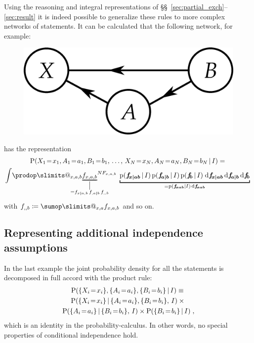 \documentclass[\ifafour a4paper,12pt,\else a5paper,10pt,\fi%
onecolumn,oneside,article,%
british%
]{memoir}
\makeatletter
\theoremstyle{remark}
\theoremstyle{innote}
\def\sum{\DOTSI\sumop\slimits@}
\def\prod{\DOTSI\prodop\slimits@}
\newcommand*{\di}{\mathrm{d}}%
\newcommand*{\defd}{\coloneqq}
\DeclarePairedDelimiter\set{\{}{\}}
\newcommand*{\pf}{\mathrm{p}}%
\newcommand*{\p}{\mathrm{P}}%
\renewcommand*{\|}[1][]{\nonscript\,#1\vert\nonscript\,\mathopen{}}
\newcommand*{\sects}{\S\S}%
\renewcommand*{\=}{\TextOrMath\texteq\eq}
\newcommand*{\X}[1]{X_{#1}}
\newcommand*{\x}[1]{x_{#1}}
\newcommand*{\A}[1]{A_{#1}}
\newcommand*{\va}[1]{a_{#1}}
\newcommand*{\B}[1]{B_{#1}}
\newcommand*{\vb}[1]{b_{#1}}
\newcommand*{\ff}[1]{f_{#1}}
\newcommand*{\ffb}[1]{\bm{f_{\!#1}}}
\newcommand*{\FF}[1]{F_{#1}}
\newcommand*{\bcond}[1][]{\nonscript\,#1\bm{\vert}\nonscript\;\mathopen{}}
\makeatother
\begin{document}
Using the reasoning and integral representations of
\sects~\ref{sec:partial_exch}--\ref{sec:result} it is indeed possible to
generalize these rules to more complex networks of statements. It can be
calculated that the following network, for example:\\
\begin{figure}[h!]
\centering\includegraphics[scale=0.5]{bayesnet3.png}
\caption{\label{fig:dep3net}}  
\end{figure}%
has the representation
\begin{multline}
  \label{eq:example1}
  \p( \X{1}\=\x{1}, \A{1}\=\va{1}, \B{1}\=\vb{1},\, \dotsc,\,
   \X{N}\=\x{N}, \A{N}\=\va{N}, \B{N}\=\vb{N} \| I) ={}\\
\int\!\prod_{x,a,b} {\underbracket[1pt][0pt]{\ff{x,a,b}}_{\mathclap{%
\begin{gathered}
\scriptstyle\big\vert\\[-2\jot]     
\scriptstyle{}=\ff{x \bcond a,b}\, \ff{,a \bcond b}\, \ff{,,b}
\end{gathered}%
}}}^{N \FF{x,a,b}}\;
\underbracket[1pt]{\pf(\ffb{x \bcond ab}\|I)\,\pf(\ffb{a \bcond b}\|I)\,\pf(\ffb{b}\|I)
  \;\di\ffb{x \bcond ab} \,\di\ffb{a \bcond b} \,\di\ffb{b}}_{{}=
\pf(\ffb{xab}\|I)\,\di\ffb{xab}} \;
\end{multline}
with $\ff{,,b} \defd \sum_{x,a}\ff{x,a,b}$ and so on.

\subsection{Representing additional independence assumptions}
\label{sec:graph_repr_indep}

In the last example the joint probability density for all the statements is
decomposed in full accord with the product rule:
\begin{multline}
  \label{eq:example_usual_factorization}
  \p( \set{\X{i}\=\x{i}}, \set{\A{i}\=\va{i}}, \set{\B{i}\=\vb{i}} \| I)
  \equiv{}\\
  \p( \set{\X{i}\=\x{i}} \| \set{\A{i}\=\va{i}}, \set{\B{i}\=\vb{i}},\, I)
  \times{}\\
  \p(\set{\A{i}\=\va{i}} \| \set{\B{i}\=\vb{i}},\, I)
\times \p(  \set{\B{i}\=\vb{i}}\| I) \;,
\end{multline}
which is an identity in the probability-calculus. In other words, no
special properties of conditional independence hold.
\end{document}
